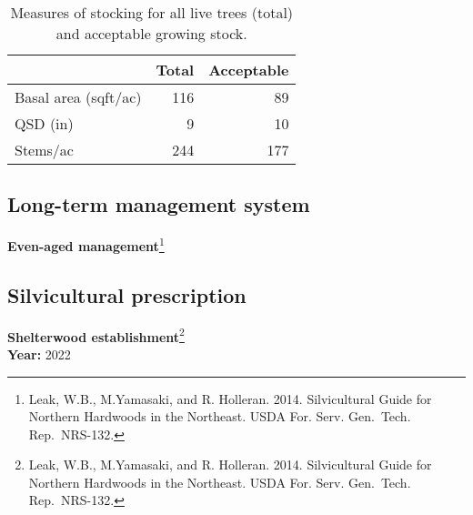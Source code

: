 \documentclass[]{tufte-handout}
\begin{document}
\begin{table}

\caption{\label{tab:unnamed-chunk-29}Measures of stocking for all live trees (total) and acceptable growing stock.}
\centering
\begin{tabular}[t]{lrr}
\toprule
  & Total & Acceptable\\
\midrule
Basal area (sqft/ac) & 116 & 89\\
QSD (in) & 9 & 10\\
Stems/ac & 244 & 177\\
\bottomrule
\end{tabular}
\end{table}

\subsection{Long-term management
system}\label{long-term-management-system-6}

\textbf{Even-aged management}\footnote{Leak, W.B., M.Yamasaki, and R.
  Holleran. 2014. Silvicultural Guide for Northern Hardwoods in the
  Northeast. USDA For. Serv. Gen.~Tech. Rep.~NRS-132.}

\subsection{Silvicultural
prescription}\label{silvicultural-prescription-6}

\textbf{Shelterwood establishment}\footnote{Leak, W.B., M.Yamasaki, and
  R. Holleran. 2014. Silvicultural Guide for Northern Hardwoods in the
  Northeast. USDA For. Serv. Gen.~Tech. Rep.~NRS-132.}\\
\textbf{Year:} 2022

\newpage
\end{document}
